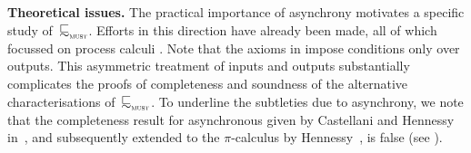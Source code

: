 {\bfseries Theoretical issues.} %
The practical importance of asynchrony motivates a %
specific study of~$\testleqS$. Efforts in this direction have
already been made, all of which focussed on process calculi
\cite{DBLP:conf/fsttcs/CastellaniH98,DBLP:journals/iandc/BorealeNP02,DBLP:phd/us/Thati03,DBLP:journals/jlp/Hennessy05}.
Note that the  axioms in  impose conditions
  only over outputs. This asymmetric treatment of inputs and outputs
substantially complicates the proofs of completeness and soundness of
the alternative characterisations of~$\testleqS$.
To underline the subtleties due to asynchrony, we note that the completeness
result for asynchronous
  \CCS given by Castellani and Hennessy
  in~\cite{DBLP:conf/fsttcs/CastellaniH98},
  and subsequently extended to the $\pi$-calculus by 
  Hennessy~\cite{DBLP:journals/jlp/Hennessy05},
  is false (see ).



